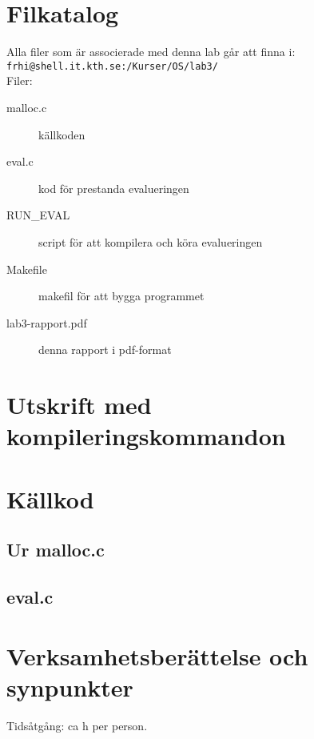 \documentclass[a4paper]{article}
\begin{document}
\section*{Filkatalog}
Alla filer som är associerade med denna lab går att finna i:\\
\texttt{frhi@shell.it.kth.se:/Kurser/OS/lab3/}
\\
Filer:
\begin{description}
\item[malloc.c] källkoden
\item[eval.c] kod för prestanda evalueringen
\item[RUN\_EVAL] script för att kompilera och köra evalueringen
\item[Makefile] makefil för att bygga programmet
\item[lab3-rapport.pdf] denna rapport i pdf-format
\end{description}

\section*{Utskrift med kompileringskommandon}


\section*{Källkod}
\subsection*{Ur malloc.c}


\subsection*{eval.c}


\section*{Verksamhetsberättelse och synpunkter}
Tidsåtgång: ca h per person.
\end{document}
